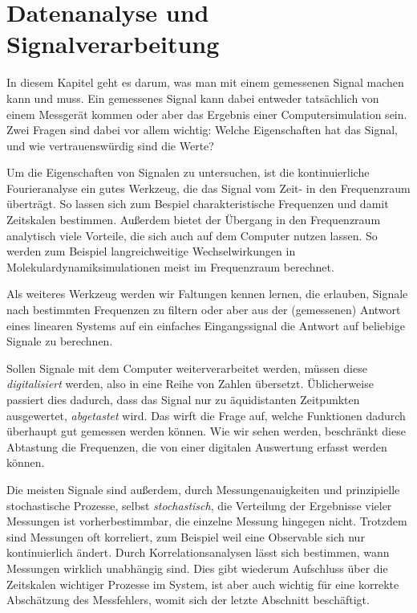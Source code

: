 % 

\chapter{Datenanalyse und Signalverarbeitung}

In diesem Kapitel geht es darum, was man mit einem gemessenen Signal
machen kann und muss. Ein gemessenes Signal kann dabei entweder
tatsächlich von einem Messgerät kommen oder aber das Ergebnis einer
Computersimulation sein. Zwei Fragen sind dabei vor allem wichtig:
Welche Eigenschaften hat das Signal, und wie vertrauenswürdig sind die
Werte?

Um die Eigenschaften von Signalen zu untersuchen, ist die
kontinuierliche Fourieranalyse ein gutes Werkzeug, die das Signal vom
Zeit- in den Frequenzraum überträgt. So lassen sich zum Bespiel
charakteristische Frequenzen und damit Zeitskalen bestimmen. Außerdem
bietet der Übergang in den Frequenzraum analytisch viele Vorteile, die
sich auch auf dem Computer nutzen lassen. So werden zum Beispiel
langreichweitige Wechselwirkungen in Molekulardynamiksimulationen
meist im Frequenzraum berechnet.

Als weiteres Werkzeug werden wir Faltungen kennen lernen, die
erlauben, Signale nach bestimmten Frequenzen zu filtern oder aber aus
der (gemessenen) Antwort eines linearen Systems auf ein einfaches
Eingangssignal die Antwort auf beliebige Signale zu berechnen.

Sollen Signale mit dem Computer weiterverarbeitet werden, müssen diese
\emph{digitalisiert} werden, also in eine Reihe von Zahlen
übersetzt. Üblicherweise passiert dies dadurch, dass das Signal nur zu
äquidistanten Zeitpunkten ausgewertet, \emph{abgetastet} wird. Das
wirft die Frage auf, welche Funktionen dadurch überhaupt gut gemessen
werden können. Wie wir sehen werden, beschränkt diese Abtastung die
Frequenzen, die von einer digitalen Auswertung erfasst werden können.

Die meisten Signale sind außerdem, durch Messungenauigkeiten und
prinzipielle stochastische Prozesse, selbst \emph{stochastisch},
\dh die Verteilung der Ergebnisse vieler Messungen ist
vorherbestimmbar, die einzelne Messung hingegen nicht. Trotzdem sind
Messungen oft korreliert, zum Beispiel weil eine Observable sich nur
kontinuierlich ändert.  Durch Korrelationsanalysen lässt sich
bestimmen, wann Messungen wirklich unabhängig sind. Dies gibt wiederum
Aufschluss über die Zeitskalen wichtiger Prozesse im System, ist aber
auch wichtig für eine korrekte Abschätzung des Messfehlers, womit sich
der letzte Abschnitt beschäftigt.

